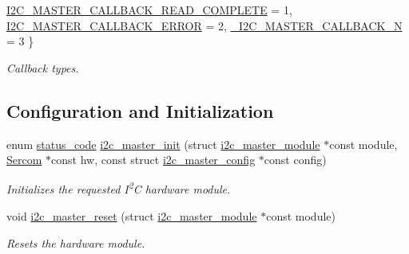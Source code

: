 \begin{DoxyCompactItemize}
\mbox{\hyperlink{group__asfdoc__sam0__sercom__i2c__group_gga844ac2694772642cfee08a29c50bf054a64edbb1496288626e11b020a887ffcf8}{I2\+C\+\_\+\+M\+A\+S\+T\+E\+R\+\_\+\+C\+A\+L\+L\+B\+A\+C\+K\+\_\+\+R\+E\+A\+D\+\_\+\+C\+O\+M\+P\+L\+E\+TE}} = 1, 
\mbox{\hyperlink{group__asfdoc__sam0__sercom__i2c__group_gga844ac2694772642cfee08a29c50bf054a97597905a886849275665273da79442f}{I2\+C\+\_\+\+M\+A\+S\+T\+E\+R\+\_\+\+C\+A\+L\+L\+B\+A\+C\+K\+\_\+\+E\+R\+R\+OR}} = 2, 
\mbox{\hyperlink{group__asfdoc__sam0__sercom__i2c__group_gga844ac2694772642cfee08a29c50bf054a3563390afb1b1b26a6252e0b5981ed06}{\+\_\+\+I2\+C\+\_\+\+M\+A\+S\+T\+E\+R\+\_\+\+C\+A\+L\+L\+B\+A\+C\+K\+\_\+N}} = 3
 \}
\begin{DoxyCompactList}\small\item\em Callback types. \end{DoxyCompactList}\end{DoxyCompactItemize}
\subsection*{Configuration and Initialization}
\begin{DoxyCompactItemize}
\item 
enum \mbox{\hyperlink{group__group__sam0__utils__status__codes_ga751c892e5a46b8e7d282085a5a5bf151}{status\+\_\+code}} \mbox{\hyperlink{group__asfdoc__sam0__sercom__i2c__group_ga1c174d923b525f6d60402f66bc9c3451}{i2c\+\_\+master\+\_\+init}} (struct \mbox{\hyperlink{structi2c__master__module}{i2c\+\_\+master\+\_\+module}} $\ast$const module, \mbox{\hyperlink{union_sercom}{Sercom}} $\ast$const hw, const struct \mbox{\hyperlink{structi2c__master__config}{i2c\+\_\+master\+\_\+config}} $\ast$const config)
\begin{DoxyCompactList}\small\item\em Initializes the requested I\textsuperscript{2}C hardware module. \end{DoxyCompactList}\item 
void \mbox{\hyperlink{group__asfdoc__sam0__sercom__i2c__group_ga6dc5e9982ce4d7c6acc68cb69c57883d}{i2c\+\_\+master\+\_\+reset}} (struct \mbox{\hyperlink{structi2c__master__module}{i2c\+\_\+master\+\_\+module}} $\ast$const module)
\begin{DoxyCompactList}\small\item\em Resets the hardware module. \end{DoxyCompactList}\end{DoxyCompactItemize}
